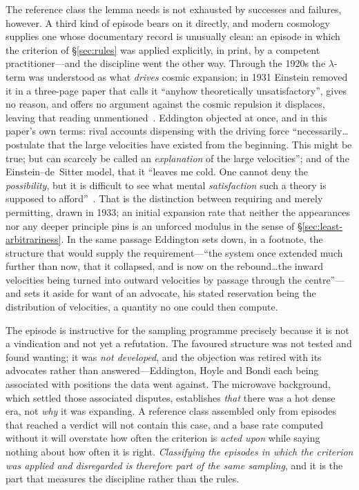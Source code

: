 \documentclass[11pt,a4paper]{article}
\begin{document}
The reference class the lemma needs is not exhausted by successes and failures, however. A third kind of episode bears on it directly, and modern cosmology supplies one whose documentary record is unusually clean: an episode in which the criterion of \S\ref{sec:rules} was applied explicitly, in print, by a competent practitioner---and the discipline went the other way. Through the 1920s the $\lambda$-term was understood as what \emph{drives} cosmic expansion; in 1931 Einstein removed it in a three-page paper that calls it ``anyhow theoretically unsatisfactory'', gives no reason, and offers no argument against the cosmic repulsion it displaces, leaving that reading unmentioned~\cite{Einstein1931, JanzenEinsteinConsiderations}. Eddington objected at once, and in this paper's own terms: rival accounts dispensing with the driving force ``necessarily\ldots postulate that the large velocities have existed from the beginning. This might be true; but can scarcely be called an \emph{explanation} of the large velocities''; and of the Einstein--de~Sitter model, that it ``leaves me cold. One cannot deny the \emph{possibility}, but it is difficult to see what mental \emph{satisfaction} such a theory is supposed to afford''~\cite{Eddington1933}. That is the distinction between requiring and merely permitting, drawn in 1933; an initial expansion rate that neither the appearances nor any deeper principle pins is an unforced modulus in the sense of \S\ref{sec:least-arbitrariness}. In the same passage Eddington sets down, in a footnote, the structure that would supply the requirement---``the system once extended much further than now, that it collapsed, and is now on the rebound\ldots the inward velocities being turned into outward velocities by passage through the centre''---and sets it aside for want of an advocate, his stated reservation being the distribution of velocities, a quantity no one could then compute.

The episode is instructive for the sampling programme precisely because it is not a vindication and not yet a refutation. The favoured structure was not tested and found wanting; it was \emph{not developed}, and the objection was retired with its advocates rather than answered---Eddington, Hoyle and Bondi each being associated with positions the data went against. The microwave background, which settled those associated disputes, establishes \emph{that} there was a hot dense era, not \emph{why} it was expanding. A reference class assembled only from episodes that reached a verdict will not contain this case, and a base rate computed without it will overstate how often the criterion is \emph{acted upon} while saying nothing about how often it is right. \emph{Classifying the episodes in which the criterion was applied and disregarded is therefore part of the same sampling}, and it is the part that measures the discipline rather than the rules.
\end{document}
